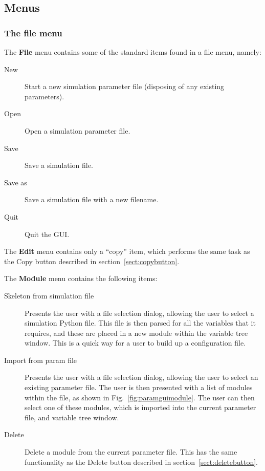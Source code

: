 \documentclass{article}
\begin{document}
\subsection{Menus}
\subsubsection{The file menu}
The {\bf File} menu contains some of the standard items found in a file
menu, namely:
\begin{description}
\item[New] Start a new simulation parameter file (disposing of any
  existing parameters).
\item[Open] Open a simulation parameter file.
\item[Save] Save a simulation file.
\item[Save as] Save a simulation file with a new filename.
\item[Quit] Quit the GUI.
\end{description}

The {\bf Edit} menu contains only a ``copy'' item, which performs the same
task as the Copy button described in section~\ref{sect:copybutton}.

The {\bf Module} menu contains the following items:
\begin{description}
\item[Skeleton from simulation file] Presents the user with a file
  selection dialog, allowing the user to select a simulation Python
  file.  This file is then parsed for all the variables that it
  requires, and these are placed in a new module within the variable
  tree window.  This is a quick way for a user to build up a
  configuration file.
\item[Import from param file] Presents the user with a file selection
  dialog, allowing the user to select an existing parameter file.  The
  user is then presented with a list of modules within the file, as
  shown in Fig.~\ref{fig:paramguimodule}.  The user can then select
  one of these modules, which is imported into the current parameter
  file, and variable tree window.
\item[Delete] Delete a module from the current parameter file.  This
  has the same functionality as the Delete button described in
  section~\ref{sect:deletebutton}.  
\end{description}
\end{document}
